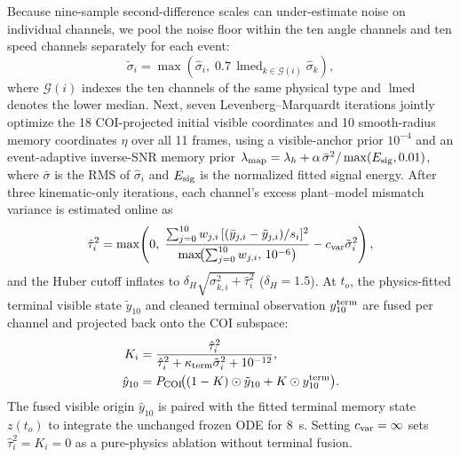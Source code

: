 \documentclass[journal]{IEEEtran}
\begin{document}
Because nine-sample second-difference scales can under-estimate noise on
individual channels, we pool the noise floor within the ten angle channels
and ten speed channels separately for each event:
\begin{equation}
 \tilde\sigma_i=\max\!\left(\hat\sigma_i,\;
 0.7\,\operatorname{lmed}_{k\in\mathcal G(i)}\hat\sigma_k\right),
 \label{eq:pooled_noise}
\end{equation}
where \(\mathcal G(i)\) indexes the ten channels of the same physical type
and \(\operatorname{lmed}\) denotes the lower median. Next, seven
Levenberg--Marquardt iterations jointly optimize the 18 COI-projected initial
visible coordinates and 10 smooth-radius memory coordinates \(\eta\) over all
11 frames, using a visible-anchor prior \(10^{-4}\) and an event-adaptive
inverse-SNR memory prior
\(\lambda_{\rm map}=\lambda_h+\alpha\,\bar\sigma^2/\max(E_{\rm sig},0.01)\),
where \(\bar\sigma\) is the RMS of \(\hat\sigma_i\) and \(E_{\rm sig}\) is
the normalized fitted signal energy. After three kinematic-only iterations,
each channel's excess plant--model mismatch variance is estimated online as
\begin{equation}
 \hat\tau_i^2=\max\!\left(0,\;
 \frac{\sum_{j=0}^{10}w_{j,i}\,[(\bar y_{j,i}-\tilde y_{j,i})/s_i]^2}
 {\max\!\bigl(\sum_{j=0}^{10}w_{j,i},\,10^{-6}\bigr)}
 -c_{\rm var}\tilde\sigma_i^2\right),
 \label{eq:mismatch_var}
\end{equation}
and the Huber cutoff inflates to
\(\delta_H\sqrt{\sigma_{k,i}^2+\hat\tau_i^2}\) (\(\delta_H=1.5\)).
At \(t_o\), the physics-fitted terminal visible state \(\tilde y_{10}\) and
cleaned terminal observation \(y^{\rm term}_{10}\) are fused per channel and
projected back onto the COI subspace:
\begin{equation}
 \begin{aligned}
 K_i &= \frac{\hat\tau_i^2}{\hat\tau_i^2+\kappa_{\rm term}\tilde\sigma_i^2+10^{-12}},\\
 \hat y_{10} &= P_{\rm COI}\!\bigl((1-K)\odot\tilde y_{10}+K\odot y^{\rm term}_{10}\bigr).
 \end{aligned}
 \label{eq:terminal_fusion}
\end{equation}
The fused visible origin \(\hat y_{10}\) is paired with the fitted terminal
memory state \(z(t_o)\) to integrate the unchanged frozen ODE for 8~s.
Setting \(c_{\rm var}=\infty\) sets \(\hat\tau_i^2=K_i=0\) as a pure-physics
ablation without terminal fusion.

\end{document}
